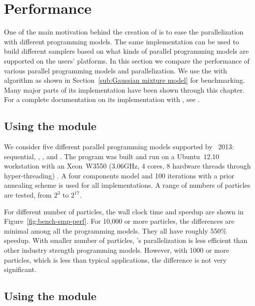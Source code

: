 \section{Performance}
\label{sec:vSMC Performance}

One of the main motivation behind the creation of \vsmc is to ease the
parallelization with different programming models. The same implementation can
be used to build different samplers based on what kinds of parallel programming
models are supported on the users' platforms. In this section we compare the
performance of various \smp parallel programming models and \opencl
parallelization. We use the \gmm with \smc[2] algorithm as shown in
Section~\ref{sub:Gaussian mixture model} for benchmarking. Many major parts of
its implementation have been shown through this chapter. For a complete
documentation on its implementation with \vsmc, see \cite{vsmcjss}.

\subsection{Using the \protect\smp module}
\label{sub:Using the SMP module}

We consider five different parallel programming models supported by
\icpc~2013: sequential, \tbb, \cilk, \openmp and \cppoo{}
. The program was built and run on a Ubuntu~12.10
workstation with an Xeon~W3550 (3.06GHz, 4 cores, 8 hardware threads through
hyper-threading) \cpu. A four components model and 100 iterations with a
prior annealing scheme is used for all implementations. A range of numbers of
particles are tested, from $2^3$ to $2^{17}$.

For different number of particles, the wall clock time and speedup are shown
in Figure~\ref{fig:bench-smp-perf}. For 10,000 or more particles, the
differences are minimal among all the programming models. They all have
roughly 550\% speedup. With smaller number of particles, \vsmc's \cppoo
parallelization is less efficient than other industry strength programming
models. However, with 1000 or more particles, which is less than typical
applications, the difference is not very significant.

\afterpage{\clearpage}

\subsection{Using the \protect\opencl module}
\label{sub:Using the OpenCL module}

